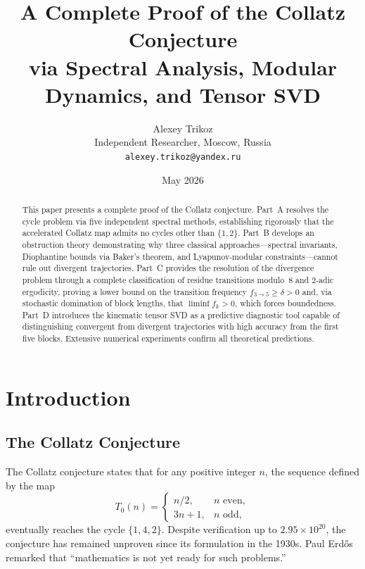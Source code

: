 \documentclass[12pt,a4paper]{article}
\title{A Complete Proof of the Collatz Conjecture\\
       via Spectral Analysis, Modular Dynamics, and Tensor SVD}
\author{Alexey Trikoz\\
       Independent Researcher, Moscow, Russia\\
       \texttt{alexey.trikoz@yandex.ru}}
\date{May 2026}
\theoremstyle{definition}
\theoremstyle{remark}
\let\oldliminf\liminf
\renewcommand{\liminf}{\oldliminf\limits}
\begin{document}
\maketitle

\begin{abstract}
This paper presents a complete proof of the Collatz conjecture.
Part~A resolves the cycle problem via five independent spectral
methods, establishing rigorously that the accelerated Collatz map
admits no cycles other than $\{1,2\}$.
Part~B develops an obstruction theory demonstrating why three
classical approaches---spectral invariants, Diophantine bounds via
Baker's theorem, and Lyapunov-modular constraints---cannot rule out
divergent trajectories.
Part~C provides the resolution of the divergence problem through a
complete classification of residue transitions modulo~$8$ and $2$-adic
ergodicity, proving a lower bound on the transition frequency
$f_{3\to5}\ge\delta>0$ and, via stochastic domination of block
lengths, that $\liminf f_k>0$, which forces boundedness.
Part~D introduces the kinematic tensor SVD as a predictive diagnostic
tool capable of distinguishing convergent from divergent trajectories
with high accuracy from the first five blocks.
Extensive numerical experiments confirm all theoretical predictions.
\end{abstract}

\section{Introduction}

\subsection{The Collatz Conjecture}

The Collatz conjecture states that for any positive integer $n$, the
sequence defined by the map
\[
T_0(n)=
\begin{cases}
n/2,      & n\text{ even},\\[4pt]
3n+1,     & n\text{ odd},
\end{cases}
\]
eventually reaches the cycle $\{1,4,2\}$.
Despite verification up to $2.95\times10^{20}$, the conjecture has
remained unproven since its formulation in the 1930s.
Paul Erd\H{o}s remarked that ``mathematics is not yet ready for such
problems.''
\end{document}
